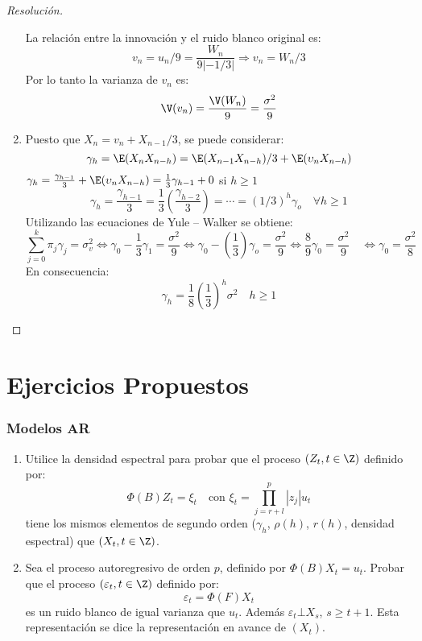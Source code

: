\begin{ejemplo}
\begin{proof}[Resoluci\'{o}n]
\begin{enumerate}
La relaci\'{o}n entre la innovaci\'{o}n y el ruido blanco original es:
\[
v_{n} =u_{n} /9=\frac{W_{n} }{9\left| {-1/3} \right|}
\Longrightarrow 
v_{n} =W_{n} /3
\]
Por lo tanto la varianza de $v_{n}$ es:
\[
\V(v_{n} )=\frac{\V(W_{n} )}{9}=\frac{\sigma^{2}}{9}
\]

\item Puesto que $X_{n} =v_{n} +X_{n-1} /3$, se puede considerar:
\[
\gamma_{h} =\E(X_{n} X_{n-h} )=\E(X_{n-1} X_{n-h} )/3+\E(\upsilon_{n} X_{n-h} )
\]
$\gamma_{h} =\frac{\gamma_{h-1} }{3}+\E(\upsilon_{n} X_{n-h} 
)=\frac{1}{3}\gamma_{h-1} +0$ si $h\ge 1$
\[
\gamma_{h} =\frac{\gamma_{h-1} }{3}=\frac{1}{3}(\frac{\gamma_{h-2} 
}{3})=\cdots=(1/3)^{h}\gamma_{o} 
\quad
\forall h\ge 1
\]
Utilizando las ecuaciones de Yule -- Walker se obtiene:
\[
\sum_{j=0}^k {\pi_{j} } \gamma_{j} =\sigma_{v}^{2}\Leftrightarrow 
\gamma_{0} -\frac{1}{3}\gamma_{1} =\frac{\sigma^{2}}{9}
\Leftrightarrow \gamma_{0} -\left( {\frac{1}{3}} \right)\gamma_{o} 
=\frac{\sigma^{2}}{9}
\Leftrightarrow \frac{8}{9}\gamma_{0} =\frac{\sigma^{2}}{9}
\quad
\Leftrightarrow \gamma_{0} =\frac{\sigma^{2}}{8}
\]
En consecuencia:
\[
\gamma_{h} =\frac{1}{8}\left( {\frac{1}{3}} \right)^{h}\sigma^{2}
\quad
h\ge 1
\]
\end{enumerate}
\end{proof}
\end{ejemplo}


\section{Ejercicios Propuestos}

\subsubsection*{Modelos AR}

\begin{enumerate}
 \item Utilice la densidad espectral para probar que el proceso $(Z_{{t}}, t\in \Z)$ definido por:
 \[
  \Phi \left( B \right)Z_{t} =\xi_{t}\quad\text{con }\xi_{t} =\prod_{j=r+l}^{p} \left| {z_{j} } \right|u_{t} 
 \]
tiene los mismos elementos de segundo orden ($\gamma_{h}$, $\rho( h)$, $r(h)$, densidad espectral) que $\left({X_{t} ,t\in \Z} \right)$.

\item Sea el proceso autoregresivo de orden $p$, definido por $\Phi \left( B \right)X_{t} =u_{t} $. Probar que el proceso $(\varepsilon_t, t\in \Z)$ definido por:
\[
\varepsilon_{t} =\Phi \left( F \right)X_{t} 
\]
es un ruido blanco de igual varianza que $u_{{t}}$. Adem\'{a}s 
$\varepsilon_{t} \bot X_{s}$, $s\ge t+1$. Esta representaci\'{o}n se dice 
la representaci\'{o}n en avance de $(X_{t} )$.
\end{enumerate}



